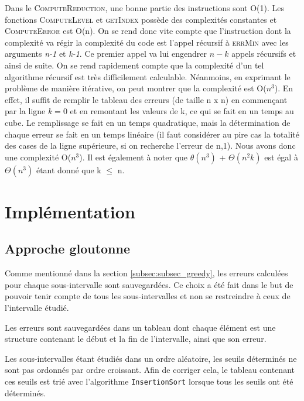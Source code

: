 \documentclass[a4paper, 12pt]{article}
\begin{document}
	Dans le \textsc{ComputeReduction}, une bonne partie des instructions sont O(1). Les fonctions \textsc{ComputeLevel} et \textsc{getIndex} possède des complexités constantes et \textsc{ComputeError} est O(n). On se rend donc vite compte que l'instruction dont la complexité va régir la complexité du code est l'appel récursif à \textsc{errMin} avec les arguments \textit{n-1} et \textit{k-1}. Ce premier appel va lui engendrer $n-k$ appels récursifs et ainsi de suite. On se rend rapidement compte que la complexité d'un tel algorithme récursif est très difficilement calculable. Néanmoins, en exprimant le problème de manière itérative, on peut montrer que la complexité est O($n^3$). En effet, il suffit de remplir le tableau des erreurs (de taille n x n) en commençant par la ligne $k=0$ et en remontant les valeurs de k, ce qui se fait en un temps au cube. Le remplissage se fait en un temps quadratique, mais la détermination de chaque erreur se fait en un temps linéaire (il faut considérer au pire cas la totalité des cases de la ligne supérieure, si on recherche l'erreur de n,1). Nous avons donc une complexité O($n^3$). Il est également à noter que $\theta (n^3)$ + $\Theta (n^2k)$ est égal à $\Theta (n^3)$ étant donné que k $\leq$ n.
	
	\section{Implémentation}
	
	\subsection{Approche gloutonne}
	Comme mentionné dans la section \ref{subsec:subsec_greedy}, les erreurs calculées pour chaque sous-intervalle sont sauvegardées. Ce choix a été fait dans le but de pouvoir tenir compte de tous les sous-intervalles et non se restreindre à ceux de l'intervalle étudié.\par
	Les erreurs sont sauvegardées dans un tableau dont chaque élément est une structure contenant le début et la fin de l'intervalle, ainsi que son erreur.\par
	Les sous-intervalles étant étudiés dans un ordre aléatoire, les seuils déterminés ne sont pas ordonnés par ordre croissant. Afin de corriger cela, le tableau contenant ces seuils est trié avec l'algorithme \texttt{InsertionSort} lorsque tous les seuils ont été déterminés.
	
\end{document}

